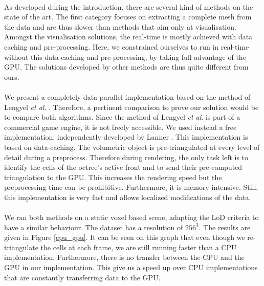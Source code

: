 \paragraph{}
As developed during the introduction, there are several kind of methods on the state of the art.
The first category focuses on extracting a complete mesh from the data and are thus slower than methods that aim only at visualisation.
Amongst the visualisation solutions, the real-time is mostly achieved with data caching and pre-processing.
Here, we constrained ourselves to run in real-time without this data-caching and pre-processing, by taking full advantage of the GPU.
The solutions developed by other methods are thus quite different from ours.

\paragraph{}
We present a completely data parallel implementation based on the method of Lengyel \textit{et al}. \cite{lengyel2010voxel}.
Therefore, a pertinent comparison to prove our solution would be to compare both algorithms.
Since the method of Lengyel \textit{et al}. is part of a commercial game engine, it is not freely accessible.
We used instead a free implementation, independently developed by Lanner \cite{lanner}.
This implementation is based on data-caching.
The volumetric object is pre-triangulated at every level of detail during a preprocess.
Therefore during rendering, the only task left is to identify the cells of the octree's active front and to send their pre-computed triangulation to the GPU.
This increases the rendering speed but the preprocessing time can be prohibitive.
Furthermore, it is memory intensive.
Still, this implementation is very fast and allows localized modifications of the data.

\paragraph{}
We ran both methods on a static voxel based scene, adapting the LoD criteria to have a similar behaviour.
The dataset has a resolution of $256^3$.
The results are given in Figure \ref{cpu_gpu}.
It can be seen on this graph that even though we re-triangulate the cells at each frame, we are still running faster than a CPU implementation.
Furthermore, there is no transfer between the CPU and the GPU in our implementation.
This give us a speed up over CPU implementations that are constantly transferring data to the GPU.


